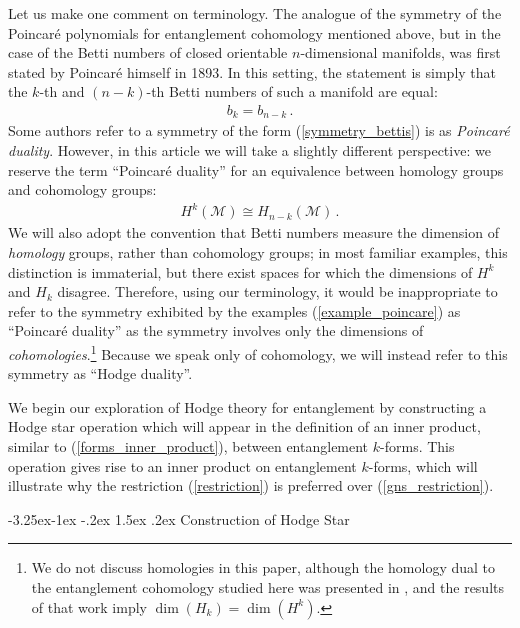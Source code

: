 \documentclass[12pt]{article}
\makeatletter
\renewcommand\subsection{\@startsection{subsection}{2}{\z@}%
                                     {-3.25ex\@plus -1ex \@minus -.2ex}%
                                     {1.5ex \@plus .2ex}%
                                     {\normalfont\bfseries}}
\numberwithin{equation}{section}
\makeatother
\begin{document}
Let us make one comment on terminology. The analogue of the symmetry of the Poincar\'e polynomials for entanglement cohomology mentioned above, but in the case of the Betti numbers of closed orientable $n$-dimensional manifolds, was first stated by Poincar\'e himself in 1893. In this setting, the statement is simply that the $k$-th and $(n-k)$-th Betti numbers of such a manifold are equal:
%
\begin{align}\label{symmetry_bettis}
    b_k = b_{n - k} \, .
\end{align}
%
Some authors refer to a symmetry of the form (\ref{symmetry_bettis}) is as \emph{Poincar\'e duality}. However, in this article we will take a slightly different perspective: we reserve the term ``Poincar\'e duality'' for an equivalence between homology groups and cohomology groups:
%
\begin{align}
    H^k ( \mathcal{M} ) \cong H_{n - k} ( \mathcal{M} ) \, .
\end{align}
%
We will also adopt the convention that Betti numbers measure the dimension of \emph{homology} groups, rather than cohomology groups; in most familiar examples, this distinction is immaterial, but there exist spaces for which the dimensions of $H^k$ and $H_k$ disagree. Therefore, using our terminology, it would be inappropriate to refer to the symmetry exhibited by the examples (\ref{example_poincare}) as ``Poincar\'e duality'' as the symmetry involves only the dimensions of \emph{cohomologies}.\footnote{We do not discuss homologies in this paper, although the homology dual to the entanglement cohomology studied here was presented in \cite{Mainiero:2019enr}, and the results of that work imply $\dim ( H_k ) = \dim ( H^k )$.} Because we speak only of cohomology, we will instead refer to this symmetry as ``Hodge duality''.


We begin our exploration of Hodge theory for entanglement by constructing a Hodge star operation which will appear in the definition of an inner product, similar to (\ref{forms_inner_product}), between entanglement $k$-forms. This operation gives rise to an inner product on entanglement $k$-forms, which will illustrate why the restriction (\ref{restriction}) is preferred over (\ref{gns_restriction}).

\subsection{Construction of Hodge Star}\label{sec:hodge_star}
\end{document}
